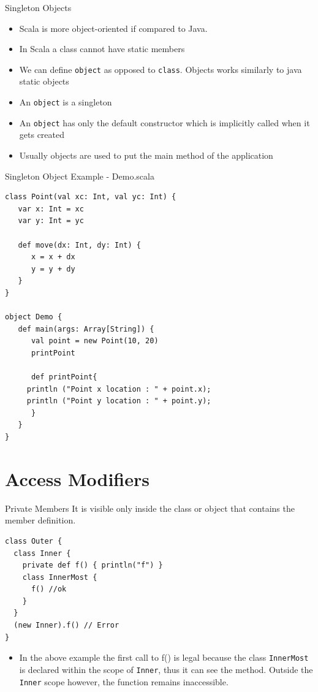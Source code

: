 \documentclass[presentation, aspectratio=169]{beamer}
\begin{document}
\begin{frame}[label={sec:org6333ddf},fragile]{Singleton Objects}
 \begin{itemize}
\item Scala is more object-oriented if compared to Java.
\item In Scala a class cannot have static members
\item We can define \texttt{object} as opposed to \texttt{class}. Objects works similarly to java static objects
\item An \texttt{object} is a singleton
\item An \texttt{object} has only the default constructor which is implicitly  called when it gets created
\item Usually objects are used to put the main method of the application
\end{itemize}
\end{frame}


\begin{frame}[label={sec:orgc77d9a4},fragile]{Singleton Object Example - Demo.scala}
 \tiny
\begin{verbatim}
class Point(val xc: Int, val yc: Int) {
   var x: Int = xc
   var y: Int = yc

   def move(dx: Int, dy: Int) {
      x = x + dx
      y = y + dy
   }
}

object Demo {
   def main(args: Array[String]) {
      val point = new Point(10, 20)
      printPoint

      def printPoint{
	 println ("Point x location : " + point.x);
	 println ("Point y location : " + point.y);
      }
   }
}
\end{verbatim}
\end{frame}

\section{Access Modifiers}
\label{sec:org358498d}

\begin{frame}[label={sec:orgf9742bc},fragile]{Private Members}
 It is visible only inside the class or object that contains the member definition.

\begin{verbatim}
class Outer {
  class Inner {
    private def f() { println("f") }
    class InnerMost {
      f() //ok
    }
  }
  (new Inner).f() // Error
}
\end{verbatim}
\begin{itemize}
\item In the above example the first call to f() is legal because the class \texttt{InnerMost} is
declared within the scope of \texttt{Inner}, thus it can see the method.
Outside the \texttt{Inner} scope however, the function remains inaccessible.
\end{itemize}
\end{frame}
\end{document}
